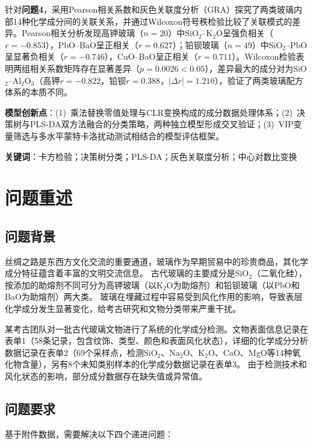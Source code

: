 \documentclass[12pt,a4paper]{ctexart}
\begin{document}
针对\textbf{问题4}，采用Pearson相关系数和灰色关联度分析（GRA）探究了两类玻璃内部14种化学成分间的关联关系，并通过Wilcoxon符号秩检验比较了关联模式的差异。Pearson相关分析发现高钾玻璃（$n=20$）中SiO$_2$--K$_2$O呈强负相关（$r=-0.853$），PbO--BaO呈正相关（$r=0.627$）；铅钡玻璃（$n=49$）中SiO$_2$--PbO呈显著负相关（$r=-0.746$），CuO--BaO呈正相关（$r=0.711$）。Wilcoxon检验表明两组相关系数矩阵存在显著差异（$p=0.0026<0.05$），差异最大的成分对为SiO$_2$--Al$_2$O$_3$（高钾$r=-0.822$，铅钡$r=0.388$，$|\Delta r|=1.210$），验证了两类玻璃配方体系的本质不同。

\textbf{模型创新点}：(1)~乘法替换零值处理与CLR变换构成的成分数据处理体系；(2)~决策树与PLS-DA双方法融合的分类策略，两种独立模型形成交叉验证；(3)~VIP变量筛选与多水平蒙特卡洛扰动测试相结合的模型评估框架。

\textbf{关键词}：卡方检验；决策树分类；PLS-DA；灰色关联度分析；中心对数比变换

\newpage

\section{问题重述}

\subsection{问题背景}

丝绸之路是东西方文化交流的重要通道，玻璃作为早期贸易中的珍贵商品，其化学成分特征蕴含着丰富的文明交流信息。
古代玻璃的主要成分是SiO$_2$（二氧化硅），按添加的助熔剂不同可分为高钾玻璃（以K$_2$O为助熔剂）和铅钡玻璃（以PbO和BaO为助熔剂）两大类\cite{1}。
玻璃在埋藏过程中容易受到风化作用的影响，导致表层化学成分发生显著变化，给考古研究和文物分类带来严重干扰。

某考古团队对一批古代玻璃文物进行了系统的化学成分检测。文物表面信息记录在表单1（58条记录，包含纹饰、类型、颜色和表面风化状态），详细的化学成分分析数据记录在表单2（69个采样点，检测SiO$_2$、Na$_2$O、K$_2$O、CaO、MgO等14种氧化物含量），另有8个未知类别样本的化学成分数据记录在表单3。
由于检测技术和风化状态的影响，部分成分数据存在缺失值或异常值。

\subsection{问题要求}

基于附件数据，需要解决以下四个递进问题：
\end{document}
